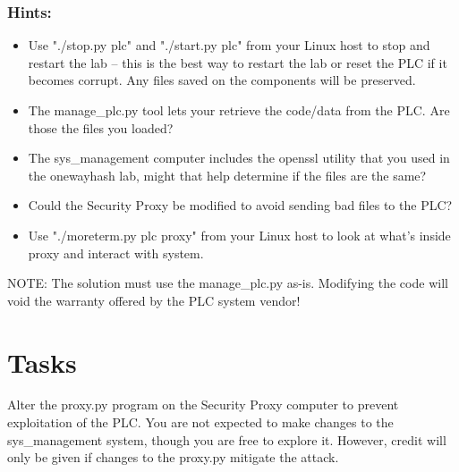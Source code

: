\documentclass{article}
\begin{document}
\subsubsection{Hints:}
\begin{itemize}
\item Use "./stop.py plc" and "./start.py plc" from your Linux host to stop and restart the lab -- this is the
best way to restart the lab or reset the PLC if it becomes corrupt.  Any files saved on the components will be preserved.
\item The manage\_plc.py tool lets your retrieve the code/data from the PLC.  Are those the files you loaded?
\item The sys\_management computer includes the openssl utility that you used in the onewayhash lab, might that
help determine if the files are the same?
\item Could the Security Proxy be modified to avoid sending bad files to the PLC?
\item Use "./moreterm.py plc proxy" from your Linux host to look at what's inside proxy and interact with system.
\end{itemize}
NOTE: The solution must use the manage\_plc.py as-is. Modifying the code will void the warranty offered by the PLC system vendor!

\section {Tasks}
Alter the proxy.py program on the Security Proxy computer to prevent exploitation of the PLC.
You are not expected to make changes to the sys\_management system, though you are free to explore it.
However, credit will only be given if changes to the proxy.py mitigate the attack.
\end{document}
